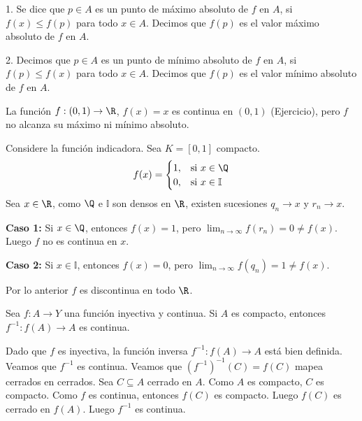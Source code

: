 \begin{definicion}
1. Se dice que $p \in A$ es un punto de máximo absoluto de $f$ en $A$, si $f(x)\le f(p)$ para todo $x\in A$. Decimos que $f(p)$ es el valor máximo absoluto de $f$ en $A$. %

2. Decimos que $p \in A$ es un punto de mínimo absoluto de $f$ en $A$, si $f(p)\le f(x)$ para todo $x\in A$. Decimos que $f(p)$ es el valor mínimo absoluto de $f$ en $A$. %
\end{definicion}

\begin{example}
La función $f:(0,1)\rightarrow \R$, $f(x) = x$ es continua en $(0,1)$ (Ejercicio), pero $f$ no alcanza su máximo ni mínimo absoluto. %
\end{example}

\begin{example}
Considere la función indicadora. Sea $K=[0,1]$ compacto. %
$$f(x) = \begin{cases} 1, & \text{si } x \in \Q \\ 0, & \text{si } x \in \mathbb{I} \end{cases}$$
Sea $x\in \R$, como $\Q$ e $\mathbb{I}$ son densos en $\R$, existen sucesiones $q_n\rightarrow x$ y $r_n\rightarrow x$. %

\textbf{Caso 1:} Si $x\in \Q$, entonces $f(x)=1$, pero $\lim_{n\to\infty} f(r_n) = 0 \neq f(x)$. Luego $f$ no es continua en $x$. %

\textbf{Caso 2:} Si $x\in \mathbb{I}$, entonces $f(x)=0$, pero $\lim_{n\to\infty} f(q_n) = 1 \neq f(x)$. %

Por lo anterior $f$ es discontinua en todo $\R$. %
\end{example}

\begin{teorema}
Sea $f:A\longrightarrow Y$ una función inyectiva y continua. Si $A$ es compacto, entonces $f^{-1}: f(A) \to A$ es continua. %
\end{teorema}

\begin{dem}
Dado que $f$ es inyectiva, la función inversa $f^{-1}: f(A) \to A$ está bien definida. %
Veamos que $f^{-1}$ es continua. Veamos que $(f^{-1})^{-1}(C) = f(C)$ mapea cerrados en cerrados. %
Sea $C \subseteq A$ cerrado en $A$. Como $A$ es compacto, $C$ es compacto. %
Como $f$ es continua, entonces $f(C)$ es compacto. Luego $f(C)$ es cerrado en $f(A)$. %
Luego $f^{-1}$ es continua. %
\end{dem}

